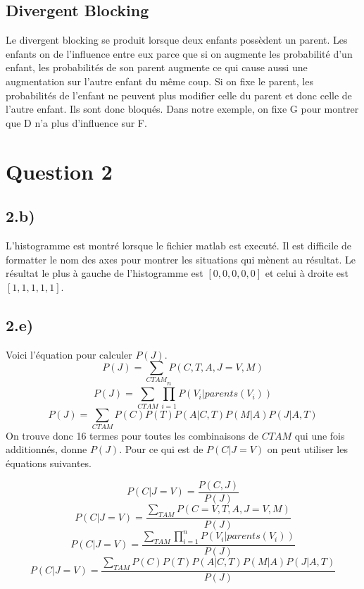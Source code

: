\documentclass[a4paper, 12pt]{article} %
\begin{document}
\subsection*{Divergent Blocking}
Le divergent blocking se produit lorsque deux enfants possèdent un parent. Les enfants
on de l'influence entre eux parce que si on augmente les probabilité d'un enfant,
les probabilités de son parent augmente ce qui cause aussi une augmentation sur l'autre enfant
du même coup. Si on fixe le parent, les probabilités de l'enfant ne peuvent plus modifier celle
du parent et donc celle de l'autre enfant. Ils sont donc bloqués. Dans notre exemple, 
on fixe G pour montrer que D n'a plus d'influence sur F.

\section*{Question 2}
\subsection*{2.b)}
L'histogramme est montré lorsque le fichier matlab est executé. Il est difficile de formatter
le nom des axes pour montrer les situations qui mènent au résultat. Le résultat le plus à gauche
de l'histogramme est $[0,0,0,0,0]$ et celui à droite est $[1,1,1,1,1]$.

\subsection*{2.e)}
Voici l'équation pour calculer $P(J)$.
\begin{equation}
    P(J) = \sum\limits_{CTAM} P(C,T,A,J = V, M)
\end{equation}
\begin{equation}
    P(J) = \sum\limits_{CTAM} \prod\limits_{i = 1}^{n}P(V_{i}|parents(V_{i}))
\end{equation}
\begin{equation}
    P(J) = \sum\limits_{CTAM} P(C)P(T)P(A|C,T)P(M|A)P(J|A,T)
\end{equation}
On trouve donc 16 termes pour toutes les combinaisons de $CTAM$ qui une fois additionnés,
donne $P(J)$. Pour ce qui est de $P(C | J = V)$ on peut utiliser les équations suivantes.

\begin{equation}
    P(C|J = V) = \frac{P(C,J)}{P(J)}
\end{equation}
\begin{equation}
    P(C|J = V) = \frac{\sum\limits_{TAM} P(C = V,T,A,J = V, M)}{P(J)}
\end{equation}
\begin{equation}
    P(C|J = V) = \frac{\sum\limits_{TAM} \prod\limits_{i = 1}^{n}P(V_{i}|parents(V_{i}))}{P(J)}
\end{equation}
\begin{equation}
    P(C|J = V) = \frac{\sum\limits_{TAM} P(C)P(T)P(A|C,T)P(M|A)P(J|A,T)}{P(J)}
\end{equation}
\end{document}
